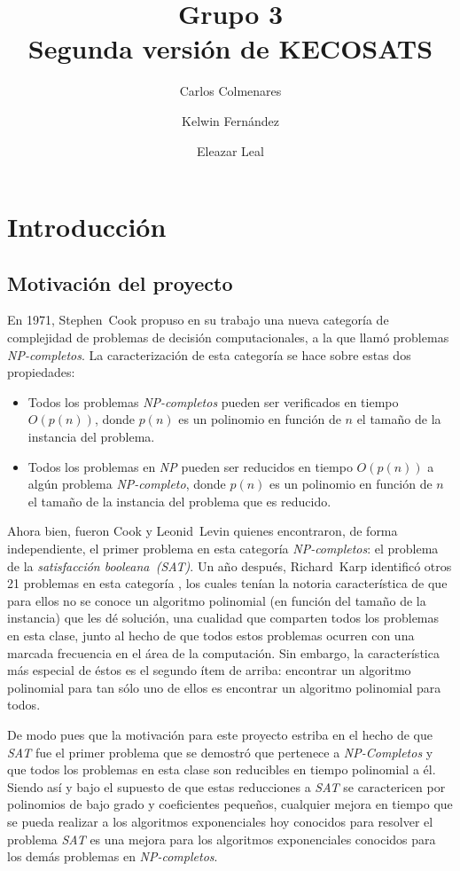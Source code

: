 \documentclass[12pt,lettersize,oneside]{article}
\title{Grupo 3 \\Segunda versión de KECOSATS}
\author{Carlos Colmenares \and Kelwin Fernández \and Eleazar Leal}
\begin{document}
\maketitle
\setlength{\parskip}{2.5mm}
\setlength{\itemsep}{0ex }
\section{Introducción}

\subsection{Motivación del proyecto}
En 1971, Stephen~Cook propuso en su trabajo\cite{Cook} una nueva categoría de
complejidad de problemas de decisión computacionales, a la que llamó problemas
\emph{NP-completos}. La caracterización de esta categoría se hace sobre estas
dos propiedades:
\begin{itemize}
  \item Todos los problemas \emph{NP-completos} pueden ser verificados en tiempo
    $O(p(n))$, donde $p(n)$ es un polinomio en función de $n$ el tamaño de la
    instancia del problema. 
  \item Todos los problemas en \emph{NP} pueden ser reducidos en tiempo
    $O(p(n))$ a algún problema \emph{NP-completo}, donde $p(n)$ es un polinomio
    en función de $n$ el tamaño de la instancia del problema que es reducido.
\end{itemize}

Ahora bien, fueron Cook y Leonid~Levin quienes encontraron, de forma
independiente, el primer problema en esta categoría \emph{NP-completos}: el
problema de la \emph{satisfacción booleana~(SAT)}. Un año después, Richard~Karp
identificó otros 21 problemas en esta categoría \cite{Karp}, los cuales tenían
la notoria característica de que para ellos no se conoce un algoritmo polinomial
(en función del tamaño de la instancia) que les dé solución, una cualidad que
comparten todos los problemas en esta clase, junto al hecho de que todos estos
problemas ocurren con una marcada frecuencia en el área de la computación. Sin
embargo, la característica más especial de éstos es el segundo ítem de arriba:
encontrar un algoritmo polinomial para tan sólo uno de ellos es encontrar un
algoritmo polinomial para todos.

De modo pues que la motivación para este proyecto estriba en el hecho de que
\emph{SAT} fue el primer problema que se demostró que pertenece a
\emph{NP-Completos} y que todos los problemas en esta clase son reducibles en
tiempo polinomial a él. Siendo así y bajo el supuesto de que estas reducciones a
\emph{SAT} se caractericen por polinomios de bajo grado y coeficientes pequeños,
cualquier mejora en tiempo que se pueda realizar a los algoritmos exponenciales
hoy conocidos para resolver el problema \emph{SAT} es una mejora para los
algoritmos exponenciales conocidos para los demás problemas en
\emph{NP-completos}.
\end{document}
